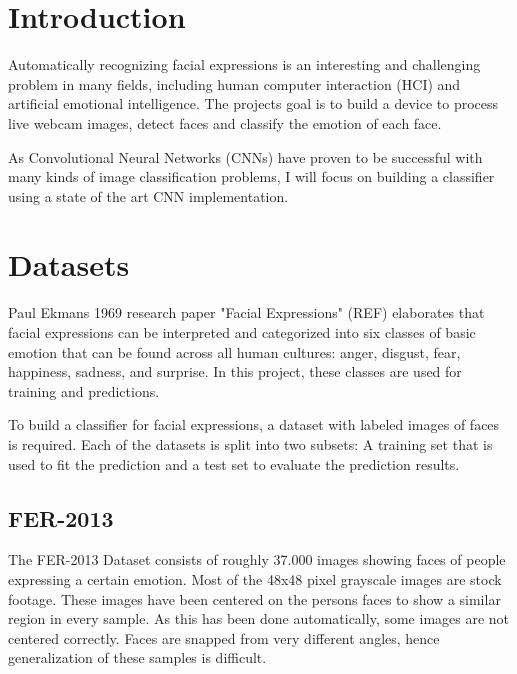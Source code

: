 \documentclass[twoside]{article}
\begin{document}
\begin{multicols}{2} %

\section{Introduction}

Automatically recognizing facial expressions is an interesting and challenging problem in many fields, including human computer interaction (HCI) and artificial emotional intelligence. The projects goal is to build a device to process live webcam images, detect faces and classify the emotion of each face.

As Convolutional Neural Networks (CNNs) have proven to be successful with many kinds of image classification  problems, I will focus on building a classifier using a state of the art CNN implementation.


\section{Datasets}

Paul Ekmans 1969 research paper "Facial Expressions" (REF) elaborates that facial expressions can be interpreted and categorized into six classes of basic emotion that can be found across all human cultures: anger, disgust, fear, happiness, sadness, and surprise. In this project, these classes are used for training and predictions.

To build a classifier for facial expressions, a dataset with labeled images of faces is required. Each of the datasets is split into two subsets: A training set that is used to fit the prediction and a test set to evaluate the prediction results.

\subsection{FER-2013}

The FER-2013 Dataset consists of roughly 37.000 images showing faces of people expressing a certain emotion. Most of the 48x48 pixel grayscale images are stock footage. These images have been centered on the persons faces to show a similar region in every sample. As this has been done automatically, some images are not centered correctly. Faces are snapped from very different angles, hence generalization of these samples is difficult.




\end{multicols}
\end{document}
